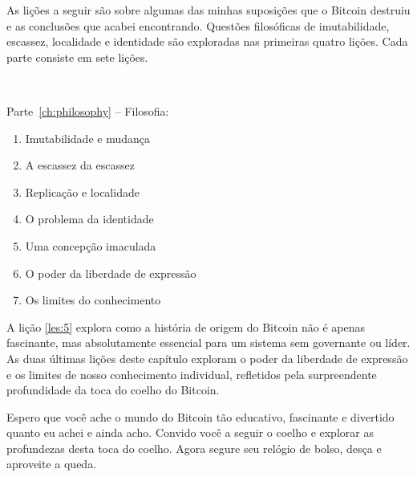As lições a seguir são sobre algumas das minhas suposições que o Bitcoin destruiu e as conclusões que acabei encontrando. Questões filosóficas de imutabilidade, escassez, localidade e identidade são exploradas nas primeiras quatro lições. Cada parte consiste em sete lições.

~

\begin{samepage}
Parte~\ref{ch:philosophy} -- Filosofia:

\begin{enumerate}
  \item Imutabilidade e mudança
  \item A escassez da escassez
  \item Replicação e localidade
  \item O problema da identidade
  \item Uma concepção imaculada
  \item O poder da liberdade de expressão
  \item Os limites do conhecimento
\end{enumerate}
\end{samepage}

A lição \ref{les:5} explora como a história de origem do Bitcoin não é apenas fascinante, mas absolutamente essencial para um sistema sem governante ou líder. As duas últimas lições deste capítulo exploram o poder da liberdade de expressão e os limites de nosso conhecimento individual, refletidos pela surpreendente profundidade da toca do coelho do Bitcoin.

Espero que você ache o mundo do Bitcoin tão educativo, fascinante e divertido quanto eu achei e ainda acho. Convido você a seguir o coelho e explorar as profundezas desta toca do coelho. Agora segure seu relógio de bolso, desça e aproveite a queda.